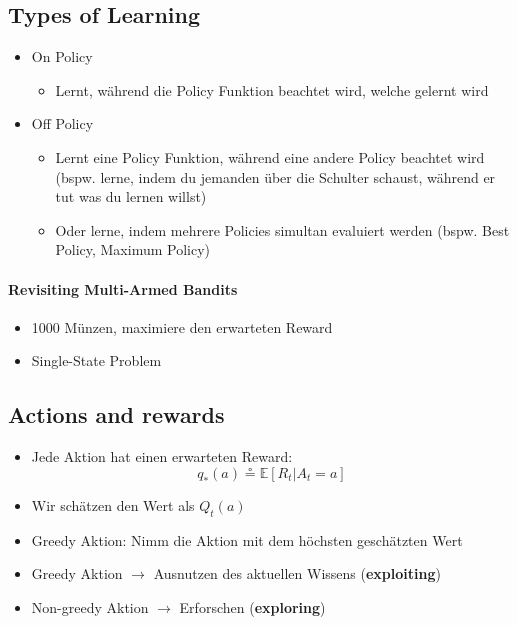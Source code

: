 \documentclass[a4paper]{article}
\begin{document}
		\subsection{Types of Learning}
		
		\begin{itemize}
			\item On Policy
				\begin{itemize}
					\item Lernt, während die Policy Funktion beachtet wird, welche gelernt wird
				\end{itemize}
			\item Off Policy
				\begin{itemize}
					\item Lernt eine Policy Funktion, während eine andere Policy beachtet wird 
					(bspw. lerne, indem du jemanden über die Schulter schaust, während er tut was du lernen willst)
					\item Oder lerne, indem mehrere Policies simultan evaluiert werden (bspw. Best Policy, Maximum Policy)
				\end{itemize}
		\end{itemize}
	
		\paragraph{Revisiting Multi-Armed Bandits}
		
		\begin{itemize}
			\item 1000 Münzen, maximiere den erwarteten Reward
			\item Single-State Problem
		\end{itemize}
	
		\subsection{Actions and rewards}
		
		\begin{itemize}
			\item Jede Aktion hat einen erwarteten Reward: \\
			$$ q_{\ast} (a) \circeq \mathbb{E} \left[ R_{t} | A_{t} = a \right] $$
			\item Wir schätzen den Wert als $Q_t(a)$
			\item Greedy Aktion: Nimm die Aktion mit dem höchsten geschätzten Wert \\
			
			\item Greedy Aktion $\rightarrow$ Ausnutzen des aktuellen Wissens (\textbf{exploiting})
			\item Non-greedy Aktion $\rightarrow$ Erforschen (\textbf{exploring})
		\end{itemize}
	
\end{document}
